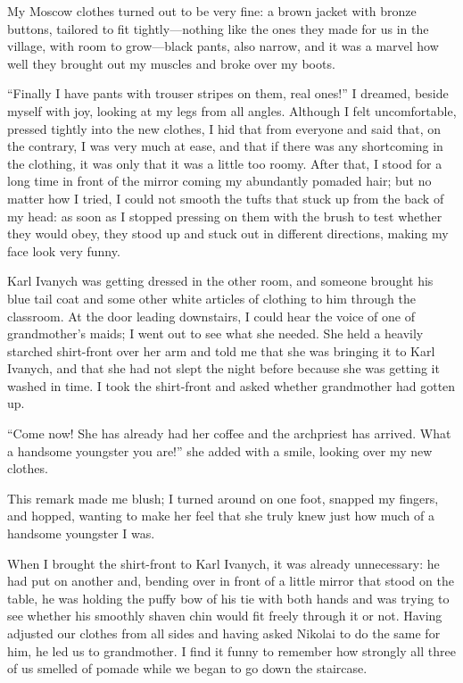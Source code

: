 My Moscow clothes turned out to be very fine: a brown jacket with bronze buttons, tailored to fit tightly---nothing like the ones they made for us in the village, with room to grow---black pants, also narrow, and it was a marvel how well they brought out my muscles and broke over my boots.

``Finally I have pants with trouser stripes on them, real ones!'' I dreamed, beside myself with joy, looking at my legs from all angles. Although I felt uncomfortable, pressed tightly into the new clothes, I hid that from everyone and said that, on the contrary, I was very much at ease, and that if there was any shortcoming in the clothing, it was only that it was a little too roomy. After that, I stood for a long time in front of the mirror coming my abundantly pomaded hair; but no matter how I tried, I could not smooth the tufts that stuck up from the back of my head: as soon as I stopped pressing on them with the brush to test whether they would obey, they stood up and stuck out in different directions, making my face look very funny.

Karl Ivanych was getting dressed in the other room, and someone brought his blue tail coat and some other white articles of clothing to him through the classroom. At the door leading downstairs, I could hear the voice of one of grandmother's maids; I went out to see what she needed. She held a heavily starched shirt-front over her arm and told me that she was bringing it to Karl Ivanych, and that she had not slept the night before because she was getting it washed in time. I took the shirt-front and asked whether grandmother had gotten up.

``Come now! She has already had her coffee and the archpriest has arrived. What a handsome youngster you are!'' she added with a smile, looking over my new clothes. %

This remark made me blush; I turned around on one foot, snapped my fingers, and hopped, wanting to make her feel that she truly knew just how much of a handsome youngster I was.

When I brought the shirt-front to Karl Ivanych, it was already unnecessary: he had put on another and, bending over in front of a little mirror that stood on the table, he was holding the puffy bow of his tie with both hands and was trying to see whether his smoothly shaven chin would fit freely through it or not. Having adjusted our clothes from all sides and having asked Nikolai to do the same for him, he led us to grandmother. I find it funny to remember how strongly all three of us smelled of pomade while we began to go down the staircase.

